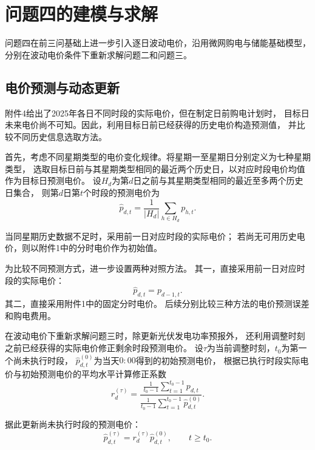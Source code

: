 \section{问题四的建模与求解}

问题四在前三问基础上进一步引入逐日波动电价，沿用微网购电与储能基础模型，分别在波动电价条件下重新求解问题二和问题三。


\subsection{电价预测与动态更新}

附件4给出了2025年各日不同时段的实际电价，但在制定日前购电计划时，
目标日未来电价尚不可知。因此，利用目标日前已经获得的历史电价构造预测值，
并比较不同历史信息选取方法。

首先，考虑不同星期类型的电价变化规律。将星期一至星期日分别定义为七种星期类型，
选取目标日前与其星期类型相同的最近两个历史日，以对应时段电价均值作为目标日预测电价。
设$H_d$为第$d$日之前与其星期类型相同的最近至多两个历史日集合，
则第$d$日第$t$个时段的预测电价为
\begin{equation}
\widehat{p}_{d,t}
=
\frac{1}{|H_d|}
\sum_{h\in H_d}p_{h,t}.
\label{eq:p4_price_wd2}
\end{equation}

当同星期历史数据不足时，采用前一日对应时段的实际电价；
若尚无可用历史电价，则以附件1中的分时电价作为初始值。

为比较不同预测方式，进一步设置两种对照方法。
其一，直接采用前一日对应时段的实际电价：
\begin{equation}
\widehat{p}_{d,t}=p_{d-1,t}.
\label{eq:p4_price_yesterday}
\end{equation}
其二，直接采用附件1中的固定分时电价。
后续分别比较三种方法的电价预测误差和购电费用。

在波动电价下重新求解问题三时，除更新光伏发电功率预报外，
还利用调整时刻之前已经获得的实际电价修正剩余时段预测电价。
设$\tau$为当前调整时刻，$t_0$为第一个尚未执行时段，
$\widehat{p}^{(0)}_{d,t}$为当天$0{:}00$得到的初始预测电价，
根据已执行时段实际电价与初始预测电价的平均水平计算修正系数
\begin{equation}
r_d^{(\tau)}
=
\frac{
\displaystyle \frac{1}{t_0-1}\sum_{t=1}^{t_0-1}p_{d,t}
}{
\displaystyle \frac{1}{t_0-1}\sum_{t=1}^{t_0-1}\widehat{p}^{(0)}_{d,t}
}.
\label{eq:p4_price_ratio}
\end{equation}

据此更新尚未执行时段的预测电价：
\begin{equation}
\widehat{p}^{(\tau)}_{d,t}
=
r_d^{(\tau)}\widehat{p}^{(0)}_{d,t},
\qquad t\geq t_0.
\label{eq:p4_price_update}
\end{equation}

